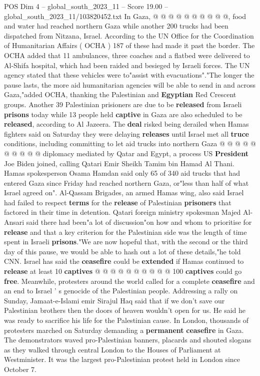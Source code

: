\begin{textsample}{POS Dim 4 – global\_south\_2023\_11 – Score 19.00 – global\_south\_2023\_11/103820452.txt}
In Gaza, @ @ @ @ @ @ @ @ @ @, food and water had reached northern Gaza while another 200 trucks had been dispatched from Nitzana, Israel.
According to the UN Office for the Coordination of Humanitarian Affairs ( OCHA ) 187 of these had made it past the border.
The OCHA added that 11 ambulances, three coaches and a flatbed were delivered to Al-Shifa hospital, which had been raided and besieged by Israeli forces.
The UN agency stated that these vehicles were to"assist with evacuations"."The longer the pause lasts, the more aid humanitarian agencies will be able to send in and across Gaza,"added OCHA, thanking the Palestinian and \textbf{Egyptian} Red Crescent groups.
Another 39 Palestinian prisioners are due to be \textbf{released} from Israeli \textbf{prisons} today while 13 people held \textbf{captive} in Gaza are also scheduled to be \textbf{released}, according to Al Jazeera.
The \textbf{deal} risked being derailed when Hamas fighters said on Saturday they were delaying \textbf{releases} until Israel met all \textbf{truce} conditions, including committing to let aid trucks into northern Gaza @ @ @ @ @ @ @ @ @ @ diplomacy mediated by Qatar and Egypt, a process US \textbf{President} Joe Biden joined, calling Qatari Emir Sheikh Tamim bin Hamad Al Thani.
Hamas spokesperson Osama Hamdan said only 65 of 340 aid trucks that had entered Gaza since Friday had reached northern Gaza, or"less than half of what Israel agreed on".
Al-Qassam Brigades, an armed Hamas wing, also said Israel had failed to respect \textbf{terms} for the \textbf{release} of Palestinian \textbf{prisoners} that factored in their time in detention.
Qatari foreign ministry spokesman Majed Al-Ansari said there had been"a lot of discussion"on how and whom to prioritise for \textbf{release} and that a key criterion for the Palestinian side was the length of time spent in Israeli \textbf{prisons}."We are now hopeful that, with the second or the third day of this pause, we would be able to hash out a lot of these details,"he told CNN.
Israel has said the \textbf{ceasefire} could be \textbf{extended} if Hamas continued to \textbf{release} at least 10 \textbf{captives} @ @ @ @ @ @ @ @ @ @ 100 \textbf{captives} could go \textbf{free}.
Meanwhile, protesters around the world called for a complete \textbf{ceasefire} and an end to Israel ' s genocide of the Palestinian people.
Addressing a rally on Sunday, Jamaat-e-Islami emir Sirajul Haq said that if we don't save our Palestinian brothers then the doors of heaven wouldn't open for us.
He said he was ready to sacrifice his life for the Palestinian cause.
In London, thousands of protesters marched on Saturday demanding a \textbf{permanent} \textbf{ceasefire} in Gaza.
The demonstrators waved pro-Palestinian banners, placards and shouted slogans as they walked through central London to the Houses of Parliament at Westminister.
It was the largest pro-Palestinian protest held in London since October 7.

\end{textsample}
